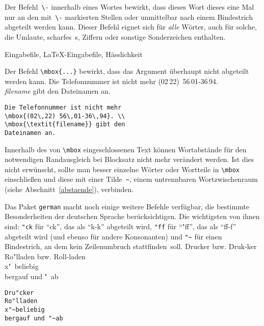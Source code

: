Der Befehl~\verb|\-| innerhalb eines Wortes bewirkt, dass dieses
Wort dieses eine Mal nur an den mit~\verb|\-|
markierten Stellen 
oder unmittelbar nach einem Bindestrich
abgeteilt werden kann.
Dieser Befehl eignet sich für \emph{alle} Wörter, auch für
solche, die Umlaute, scharfes~s, Ziffern oder sonstige
Sonderzeichen enthalten.
\begin{LTXexample}
Ein\-gabe\-file,
\LaTeX-Eingabe\-file,
Häss\-lich\-keit
\end{LTXexample}

Der Befehl \verb|\mbox{...}| bewirkt, dass das Argument überhaupt nicht
abgeteilt werden kann.
\exa
Die Telefonnummer ist nicht mehr
\mbox{(02\,22) 56\,01-36\,94}. \\
\mbox{\textit{filename}} gibt den 
Dateinamen an.
\exb 
\begin{verbatim}
Die Telefonnummer ist nicht mehr
\mbox{(02\,22) 56\,01-36\,94}. \\
\mbox{\textit{filename}} gibt den 
Dateinamen an.
\end{verbatim}
\exc
Innerhalb des von \verb|\mbox| eingeschlossenen Text können
Wortabstände für den notwendigen Randausgleich bei
Blocksatz nicht mehr verändert werden.  Ist dies nicht
erwünscht, sollte man besser einzelne Wörter oder Wortteile
in \verb|\mbox| einschließen und diese mit einer Tilde~\verb|~|,
einem untrennbaren Wortzwischenraum (siehe
Abschnitt~\ref{abstaende}), verbinden.


Das Paket \texttt{german} macht noch einige weitere Befehle
verfügbar, die bestimmte Besonderheiten der deutschen Sprache
berücksichtigen.  Die wichtigsten von ihnen sind:
\verb|"ck| für "`ck"', das als "`\mbox{k-k}"' abgeteilt wird,
\verb|"ff| für "`"ff"', das als "`\mbox{ff-f}"' abgeteilt wird
(und ebenso für andere Konsonanten)
und \verb|"~| für einen Bindestrich, an dem kein Zeilenumbruch
stattfinden~soll.
\exa
Drucker bzw. Druk-ker \\
Ro"lladen bzw. Roll-laden \\
x"~beliebig\\
bergauf und "~ab
\exb
\begin{verbatim}
Dru"cker
Ro"lladen
x"~beliebig
bergauf und "~ab
\end{verbatim}
\exc


